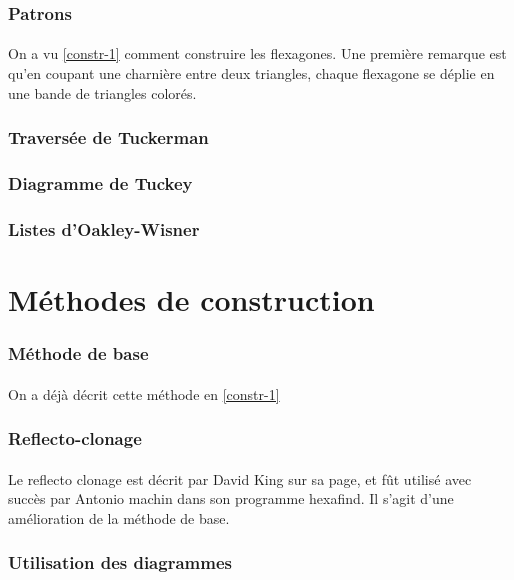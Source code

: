 \documentclass[10pt,a4paper]{article}
\begin{document}
		\subsubsection{Patrons}
			\paragraph{}On a vu \ref{constr-1} comment construire les flexagones. Une première remarque est qu'en coupant une charnière entre deux triangles, chaque flexagone se déplie en une bande de triangles colorés.
			
		\subsubsection{Traversée de Tuckerman}
		
		\subsubsection{Diagramme de Tuckey}
		
		\subsubsection{Listes d'Oakley-Wisner}


	\section{Méthodes de construction}
		\subsubsection{Méthode de base}
			\paragraph{}On a déjà décrit cette méthode en \ref{constr-1}
			
		\subsubsection{Reflecto-clonage}
			\paragraph{}Le reflecto clonage est décrit par David King sur sa page, et fût utilisé avec succès par Antonio machin dans son programme hexafind. Il s'agit d'une amélioration de la méthode de base.
			
		\subsubsection{Utilisation des diagrammes}
		
\end{document}
